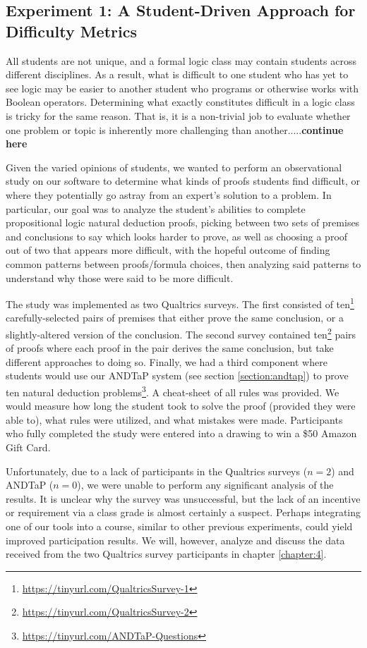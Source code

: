 \documentclass[ms]{uncgdissertationexp2}
\theoremstyle{plain}
\theoremstyle{definition}
\theoremstyle{remark}
\begin{document}
\subsection{Experiment 1: A Student-Driven Approach for Difficulty Metrics}
All students are not unique, and a formal logic class may contain students across different disciplines. As a result, what is difficult to one student who has yet to see logic may be easier to another student who programs or otherwise works with Boolean operators. Determining what exactly constitutes difficult in a logic class is tricky for the same reason. That is, it is a non-trivial job to evaluate whether one problem or topic is inherently more challenging than another.....\textbf{continue here}

Given the varied opinions of students, we wanted to perform an observational study on our software to determine what kinds of proofs students find difficult, or where they potentially go astray from an expert's solution to a problem. In particular, our goal was to analyze the student's abilities to complete propositional logic natural deduction proofs, picking between two sets of premises and conclusions to say which looks harder to prove, as well as choosing a proof out of two that appears more difficult, with the hopeful outcome of finding common patterns between proofs/formula choices, then analyzing said patterns to understand why those were said to be more difficult.

The study was implemented as two Qualtrics surveys. The first consisted of ten\footnote{\url{https://tinyurl.com/QualtricsSurvey-1}} carefully-selected pairs of premises that either prove the same conclusion, or a slightly-altered version of the conclusion. The second survey contained ten\footnote{\url{https://tinyurl.com/QualtricsSurvey-2}} pairs of proofs where each proof in the pair derives the same conclusion, but take different approaches to doing so. Finally, we had a third component where students would use our ANDTaP system (see section \ref{section:andtap}) to prove ten natural deduction problems\footnote{\url{https://tinyurl.com/ANDTaP-Questions}}. A cheat-sheet of all rules was provided. We would measure how long the student took to solve the proof (provided they were able to), what rules were utilized, and what mistakes were made. Participants who fully completed the study were entered into a drawing to win a \$50 Amazon Gift Card.

Unfortunately, due to a lack of participants in the Qualtrics surveys ($n=2$) and ANDTaP ($n=0$), we were unable to perform any significant analysis of the results. It is unclear why the survey was unsuccessful, but the lack of an incentive or requirement via a class grade is almost certainly a suspect. Perhaps integrating one of our tools into a course, similar to other previous experiments, could yield improved participation results. We will, however, analyze and discuss the data received from the two Qualtrics survey participants in chapter \ref{chapter:4}.
\end{document}
